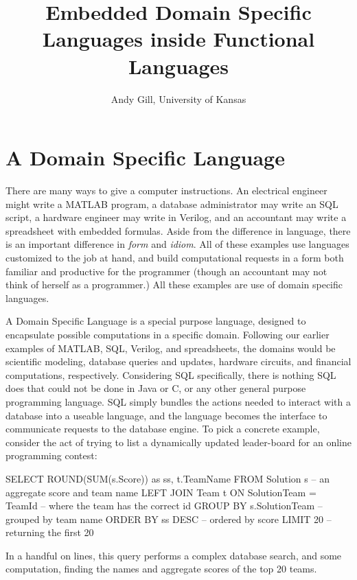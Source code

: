 \documentclass[11pt]{article}
\begin{document}
\title{Embedded Domain Specific Languages inside Functional Languages}
\author{Andy Gill, University of Kansas}
\maketitle

\section{A Domain Specific Language}

There are many ways to give a computer instructions.
%
An electrical engineer might write a MATLAB program,
a database administrator may write an SQL script,
a hardware engineer may write in Verilog,
and an accountant may write a spreadsheet
with embedded formulas.
%
Aside from the difference in language, there is an
important difference in {\em form\/} and {\em idiom\/}.
%
All of these examples use languages
customized to the job at hand, and build computational
requests in a form both familiar and productive
for the programmer (though an accountant may
not think of herself as a programmer.)
All these examples are use of domain specific languages.


A Domain Specific Language is a special purpose language,
designed to encapsulate possible computations in a specific
domain. Following our earlier examples of MATLAB, SQL,
Verilog, and spreadsheets, the domains would be scientific modeling,
database queries and updates, hardware circuits, and financial computations, respectively.
Considering SQL specifically, there is nothing SQL does that could not
be done in Java or C, or any other general purpose programming
language. SQL simply bundles the actions needed to
interact with a database into a useable language,
and the language becomes the interface to communicate requests
to the database engine.
To pick a concrete example,
consider the act of trying to list a dynamically updated leader-board
for an online programming contest:
\begin{Code}
SELECT ROUND(SUM(s.Score)) as ss, t.TeamName FROM Solution s -- an aggregate score and team name
   LEFT JOIN Team t ON SolutionTeam = TeamId                 -- where the team has the correct id
   GROUP BY s.SolutionTeam                                   -- grouped by team name
   ORDER BY ss DESC                                          -- ordered by score
   LIMIT 20                                                  -- returning the first 20
\end{Code}
In a handful on lines, this query performs a complex
database search, and some computation, finding
the names and aggregate scores of the top 20 teams.
\end{document}
